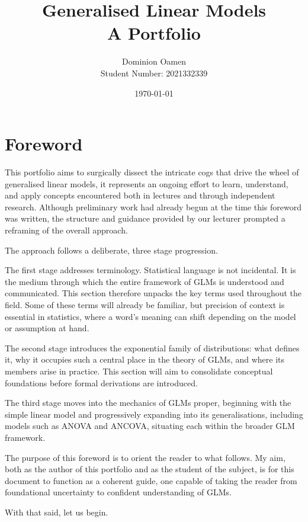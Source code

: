 \documentclass[12pt,a4paper]{report}
\title{\textbf{Generalised Linear Models}\\[0.3cm]\large A Portfolio}
\author{Dominion Oamen\\ Student Number: 2021332339}
\date{\today}
\begin{document}
\maketitle
\thispagestyle{empty}
\newpage

\chapter*{Foreword}

This portfolio aims to surgically dissect the intricate cogs that drive the wheel of generalised linear models, it represents an ongoing effort to learn, understand, and apply concepts encountered both in lectures and through independent research. Although preliminary work had already begun at the time this foreword was written, the structure and guidance provided by our lecturer prompted a reframing of the overall approach.

The approach follows a deliberate, three stage progression.

The first stage addresses terminology. Statistical language is not incidental. It is the medium through which the entire framework of GLMs is understood and communicated. This section therefore unpacks the key terms used throughout the field. Some of these terms will already be familiar, but precision of context is essential in statistics, where a word's meaning can shift depending on the model or assumption at hand.

The second stage introduces the exponential family of distributions: what defines it, why it occupies such a central place in the theory of GLMs, and where its members arise in practice. This section will aim to consolidate conceptual foundations before formal derivations are introduced.

The third stage moves into the mechanics of GLMs proper, beginning with the simple linear model and progressively expanding into its generalisations, including models such as ANOVA and ANCOVA, situating each within the broader GLM framework.

The purpose of this foreword is to orient the reader to what follows. My aim, both as the author of this portfolio and as the student of the subject, is for this document to function as a coherent guide, one capable of taking the reader from foundational uncertainty to confident understanding of GLMs.

With that said, let us begin.
\end{document}
